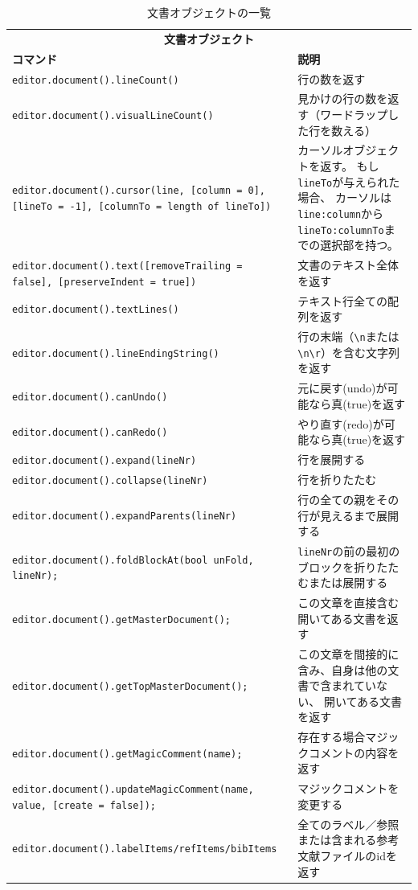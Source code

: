 \begin{table}[H]
  \centering
  \caption{文書オブジェクトの一覧}
  \begin{tabularx}{\linewidth}{XX}
    \hline
    \multicolumn{2}{c}{\textbf{文書オブジェクト}}\\
    \textbf{コマンド} & \textbf{説明}\\
    \hline
    \texttt{editor.document().lineCount()} & 行の数を返す\\
    \texttt{editor.document().visualLineCount()}
      & 見かけの行の数を返す（ワードラップした行を数える）\\
    \texttt{editor.document().cursor(line, {[}column = 0{]}, {[}lineTo = -1{]}, {[}columnTo = length of lineTo{]})}
      & カーソルオブジェクトを返す。
      もし\texttt{lineTo}が与えられた場合、
      カーソルは\texttt{line:column}から\texttt{lineTo:columnTo}までの選択部を持つ。\\
    \texttt{editor.document().text({[}removeTrailing = false{]}, {[}preserveIndent = true{]})}
      & 文書のテキスト全体を返す\\
    \texttt{editor.document().textLines()} & テキスト行全ての配列を返す\\
    \texttt{editor.document().lineEndingString()}
      & 行の末端（\verb+\n+または{\verb+\n\r+}）を含む文字列を返す\\
    \texttt{editor.document().canUndo()} & 元に戻す(undo)が可能なら真(true)を返す\\
    \texttt{editor.document().canRedo()} & やり直す(redo)が可能なら真(true)を返す\\
    \texttt{editor.document().expand(lineNr)} & 行を展開する\\
    \texttt{editor.document().collapse(lineNr)} & 行を折りたたむ\\
    \texttt{editor.document().expandParents(lineNr)}
      & 行の全ての親をその行が見えるまで展開する\\
    \texttt{editor.document().foldBlockAt(bool unFold, lineNr);}
      & \texttt{lineNr}の前の最初のブロックを折りたたむまたは展開する\\
    \texttt{editor.document().getMasterDocument();}
      & この文章を直接含む開いてある文書を返す\\
    \texttt{editor.document().getTopMasterDocument();}
      & この文章を間接的に含み、自身は他の文書で含まれていない、
      開いてある文書を返す\\
    \texttt{editor.document().getMagicComment(name);}
      & 存在する場合マジックコメントの内容を返す\\
    \texttt{editor.document().updateMagicComment(name, value, {[}create = false{]});}
      & マジックコメントを変更する\\
    \texttt{editor.document().labelItems/refItems/bibItems}
      & 全てのラベル／参照または含まれる参考文献ファイルのidを返す\\
    \hline
  \end{tabularx}
\end{table}

